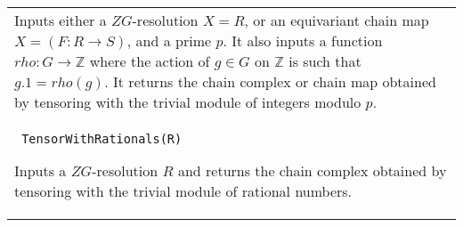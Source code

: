 \documentclass[a4paper,11pt]{report}
\begin{document}
{\begin{center}
\begin{tabular}{|l|}
 Inputs either a $ZG$-resolution $X=R$, or an equivariant chain map $X = (F:R \longrightarrow S)$, and a prime $p$. It also inputs a function $rho\colon G\rightarrow \mathbb Z$ where the action of $g \in G$ on $\mathbb Z$ is such that $g.1 = rho(g)$. It returns the chain complex or chain map obtained by tensoring with the
trivial module of integers modulo $p$. \\
 \index{TensorWithRationals} \texttt{ TensorWithRationals(R) } 

 Inputs a $ZG$-resolution $R$ and returns the chain complex obtained by tensoring with the trivial module of
rational numbers. \\
\end{tabular}\\[2mm]
\end{center}

 }

 
\end{document}
